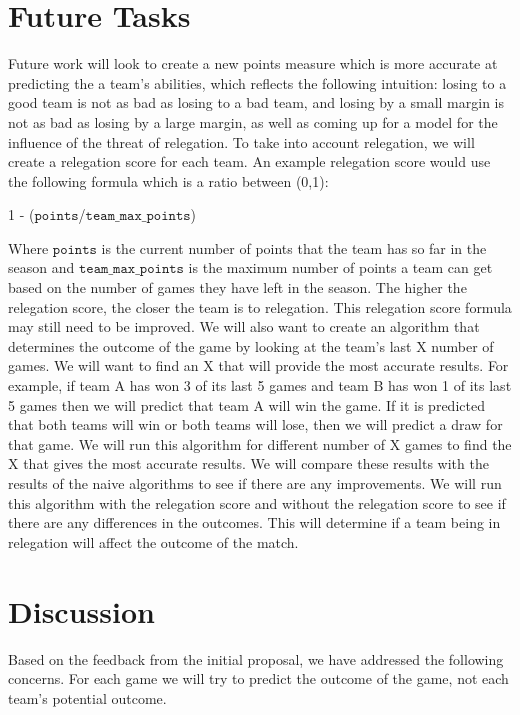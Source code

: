 \documentclass[conference]{IEEEtran}
\begin{document}
\section{Future Tasks}
Future work will look to create a new points measure which is more accurate at predicting the a team's abilities, which reflects the following intuition: losing to a good team is not as bad as losing to a bad team, and losing by a small margin is not as bad as losing by a large margin, as well as coming up for a model for the influence of the threat of relegation. 
To take into account relegation, we will create a relegation score for each team. An example relegation score would use the following formula which is a ratio between (0,1): 

\begin{center}
	1 - ($\mathtt{points}$/$\mathtt{team\_max\_points}$)
\end{center}

Where $\mathtt{points}$ is the current number of points that the team has so far in the season and $\mathtt{team\_max\_points}$ is the maximum number of points a team can get based on the number of games they have left in the season. The higher the relegation score, the closer the team is to relegation. This relegation score formula may still need to be improved.
We will also want to create an algorithm that determines the outcome of the game by looking at the team's last X number of games. We will want to find an X that will provide the most accurate results. For example, if team A has won 3 of its last 5 games and team B has won 1 of its last 5 games then we will predict that team A will win the game. If it is predicted that both teams will win or both teams will lose, then we will predict a draw for that game. We will run this algorithm for different number of X games to find the X that gives the most accurate results. We will compare these results with the results of the naive algorithms to see if there are any improvements. We will run this algorithm with the relegation score and without the relegation score to see if there are any differences in the outcomes. This will determine if a team being in relegation will affect the outcome of the match. 
\section{Discussion}
Based on the feedback from the initial proposal, we have addressed the following concerns. For each game we will try to predict the outcome of the game, not each team’s potential outcome. 
\end{document}
